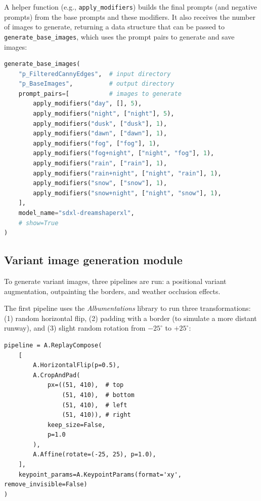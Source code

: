 A helper function (e.g., \texttt{apply\_modifiers}) builds the final prompts (and negative prompts) from the base prompts and these modifiers. 
It also receives the number of images to generate, returning a data structure that can be passed to \texttt{generate\_base\_images}, which uses the prompt pairs to generate and save images:

\begin{lstlisting}[language=Python, caption={Base Image generation module,
generating base images}]
generate_base_images(
    "p_FilteredCannyEdges",  # input directory
    "p_BaseImages",          # output directory
    prompt_pairs=[           # images to generate
        apply_modifiers("day", [], 5),
        apply_modifiers("night", ["night"], 5),
        apply_modifiers("dusk", ["dusk"], 1),
        apply_modifiers("dawn", ["dawn"], 1),
        apply_modifiers("fog", ["fog"], 1),
        apply_modifiers("fog+night", ["night", "fog"], 1),
        apply_modifiers("rain", ["rain"], 1),
        apply_modifiers("rain+night", ["night", "rain"], 1),
        apply_modifiers("snow", ["snow"], 1),
        apply_modifiers("snow+night", ["night", "snow"], 1),
    ],
    model_name="sdxl-dreamshaperxl",
    # show=True
)
\end{lstlisting}

\subsection{Variant image generation module}

To generate variant images, three pipelines are run: a positional variant augmentation, outpainting the borders, and weather occlusion effects.

The first pipeline uses the \emph{Albumentations} library \cite{buslaev_albumentations_2020} to run three transformations: 
(1) random horizontal flip, 
(2) padding with a border (to simulate a more distant runway), and 
(3) slight random rotation from $-25^\circ$ to $+25^\circ$:

\begin{lstlisting}
pipeline = A.ReplayCompose(
    [
        A.HorizontalFlip(p=0.5),
        A.CropAndPad(
            px=((51, 410),  # top
                (51, 410),  # bottom
                (51, 410),  # left
                (51, 410)), # right
            keep_size=False,
            p=1.0
        ),
        A.Affine(rotate=(-25, 25), p=1.0),
    ],
    keypoint_params=A.KeypointParams(format='xy', remove_invisible=False)
)
\end{lstlisting}

